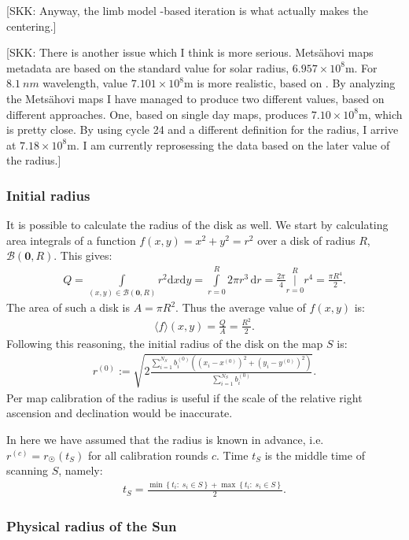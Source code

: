 \documentclass{aa}
\newcommand{\skk}[1]{\textcolor{midorange}{[SKK: #1]}} %
\newcommand{\eqnl}[2]{\begin{eqnarray}\label{#1}#2\end{eqnarray}}
\newcommand{\intef}[4]{\int \limits_{#1 = #2}^{#3} \! #4 \, \mathrm{d} #1}
\newcommand{\intes}[4]{\operatorname{\Bigg|} \limits_{#1 = #2}^{#3} \!\!\!\!\! #4}
\newcommand{\ave}[1]{\langle #1 \rangle}
\renewcommand{\min}[1]{\operatorname{min} \left\{ #1 \right\}}
\renewcommand{\max}[1]{\operatorname{max} \left\{ #1 \right\}}
\newcommand{\dd}[0]{\mathrm{d}}
\begin{document}
    \skk{Anyway, the limb model -based iteration is what actually makes the centering.}
    
    \skk{There is another issue which I think is more serious. Metsähovi maps metadata are based on the standard value 
    for solar radius, $6.957 \times 10^8 \mathrm{m}$. For $\SI{8.1}{nm}$ wavelength, value $7.101 \times 10^8 
    \mathrm{m}$ is more realistic, based on \cite{Rozelot15}. By analyzing the Metsähovi maps I have managed to produce 
    two different values, based on different approaches. One, based on single day maps, produces $7.10 \times 10^8 
    \mathrm{m}$, which is pretty close. By using cycle 24 and a different definition for the radius, I arrive at $7.18 
    \times 10^8 \mathrm{m}$. I am currently reprosessing the data based on the later value of the radius.}
    
  \subsubsection{Initial radius}\label{sect:initial-radius}

  It is possible to calculate the radius of the disk as well. We start by calculating area integrals of a function $f(x,y) = x^2+y^2 = r^2$ over a disk of radius $R$, $\mathcal{B}(\bm{0},R)$. This gives:
  \eqnl{initial_radius}{
  Q = \int \limits_{(x,y) \in \mathcal{B}(\bm{0},R)} \! r^2 \dd x \dd y = \intef{r}{0}{R}{2 \pi r^3} = \frac{2 \pi}{4} \intes{r}{0}{R}{r^4} = \frac{\pi R^4}{2} \text{.}
  }
  The area of such a disk is $A = \pi R^2$. Thus the average value of $f(x,y)$ is:
  \eqnl{initial_radius2}{
  \ave f(x,y) = \frac{Q}{A} = \frac{R^2}{2} \text{.}
  }
  Following this reasoning, the initial radius of the disk on the map $S$ is:
  \eqnl{initial_radius3}{
  r^{(0)} := \sqrt{2 \frac{\sum \limits_{i=1}^{N_S} b_i^{(0)} \left( \left( x_i - x^{(0)} \right)^2 + \left( y_i - y^{(0)} \right)^2 \right)}{\sum \limits_{i=1}^{N_S} b_i^{(0)}}} \text{.}
  }
  Per map calibration of the radius is useful if the scale of the relative right ascension and declination would be inaccurate.

  In here we have assumed that the radius is known in advance, i.e. $r^{(c)} = r_{\astrosun}(t_S)$ for all calibration rounds $c$. Time $t_S$ is the middle time of scanning $S$, namely:
  \eqnl{initial_radius_time}{
  t_S = \frac{\min{t_i :\; s_i \in S} + \max{ t_i :\; s_i \in S}}{2} \text{.}
  }

  \subsubsection{Physical radius of the Sun}\label{sect:physical_radius}
  
\end{document}
